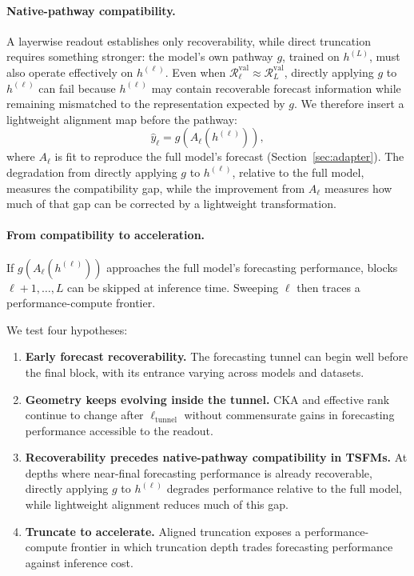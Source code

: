\documentclass{article} %
\begin{document}
\paragraph{Native-pathway compatibility.}
A layerwise readout establishes only recoverability, while direct truncation requires something stronger: the model's own pathway $g$, trained on $h^{(L)}$, must also operate effectively on $h^{(\ell)}$. Even when $\mathcal{R}_{\ell}^{\mathrm{val}} \approx \mathcal{R}_{L}^{\mathrm{val}}$, directly applying $g$ to $h^{(\ell)}$ can fail because $h^{(\ell)}$ may contain recoverable forecast information while remaining mismatched to the representation expected by $g$. We therefore insert a lightweight alignment map before the pathway:
\begin{equation}
\hat{y}_{\ell} = g\!\left(A_{\ell}\!\left(h^{(\ell)}\right)\right),
\label{eq:truncated_inference}
\end{equation}
where $A_\ell$ is fit to reproduce the full model's forecast (Section~\ref{sec:adapter}). The degradation from directly applying $g$ to $h^{(\ell)}$, relative to the full model, measures the compatibility gap, while the improvement from $A_\ell$ measures how much of that gap can be corrected by a lightweight transformation.

\paragraph{From compatibility to acceleration.}
If $g\!\left(A_{\ell}(h^{(\ell)})\right)$ approaches the full model's forecasting performance, blocks $\ell+1,\dots,L$ can be skipped at inference time. Sweeping $\ell$ then traces a performance-compute frontier. 

We test four hypotheses:

\begin{enumerate}[label=\textbf{(H\arabic*)}, ref=H\arabic*, leftmargin=*]

  \item \label{hyp:recoverability}
  \textbf{Early forecast recoverability.}
  The forecasting tunnel can begin well before the final block, with its entrance varying across models and datasets.

  \item \label{hyp:geometry}
  \textbf{Geometry keeps evolving inside the tunnel.}
  CKA and effective rank continue to change after $\ell_{\mathrm{tunnel}}$ without commensurate gains in forecasting performance accessible to the readout.

  \item \label{hyp:alignment}
  \textbf{Recoverability precedes native-pathway compatibility in TSFMs.}
  At depths where near-final forecasting performance is already recoverable, directly applying $g$ to $h^{(\ell)}$ degrades performance relative to the full model, while lightweight alignment reduces much of this gap.

  \item \label{hyp:acceleration}
  \textbf{Truncate to accelerate.}
  Aligned truncation exposes a performance-compute frontier in which truncation depth trades forecasting performance against inference cost.

\end{enumerate}
\end{document}
